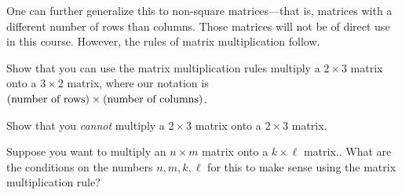 \documentclass[12pt, oneside]{report}    %
\begin{document}
One can further generalize this to non-square matrices---that is, matrices with a different number of rows than columns. Those matrices will not be of direct use in this course. However, the rules of matrix multiplication follow.
\begin{exercise}
Show that you can use the matrix multiplication rules multiply a $2\times 3$ matrix onto a $3\times 2$ matrix, where our notation is $(\textnormal{number of rows})\times(\textnormal{number of columns})$.
\end{exercise}
\begin{exercise}
Show that you \emph{cannot} multiply a $2\times 3$ matrix onto a $2 \times 3$ matrix. 
\end{exercise}
\begin{exercise}
Suppose you want to multiply an $n\times m$ matrix onto a $k \times \ell$ matrix.. What are the conditions on the numbers $n, m, k, \ell$ for this to make sense using the matrix multiplication rule?
\end{exercise}
\end{document}
